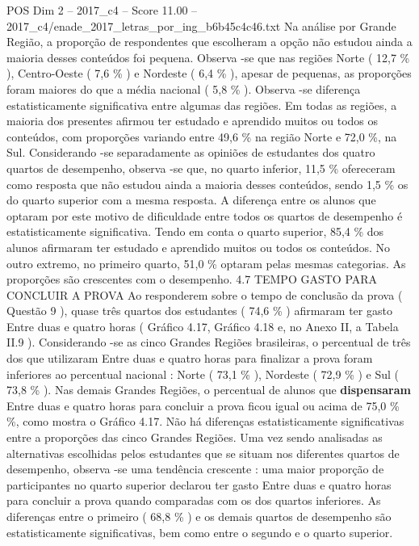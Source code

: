 \begin{textsample}{POS Dim 2 – 2017\_c4 – Score 11.00 – 2017\_c4/enade\_2017\_letras\_por\_ing\_b6b45c4c46.txt}
Na análise por Grande Região, a proporção de respondentes que escolheram a opção não estudou ainda a maioria desses conteúdos foi pequena.
Observa -se que nas regiões Norte ( 12,7 \% ), Centro-Oeste ( 7,6 \% ) e Nordeste ( 6,4 \% ), apesar de pequenas, as proporções foram maiores do que a média nacional ( 5,8 \% ).
Observa -se diferença estatisticamente significativa entre algumas das regiões.
Em todas as regiões, a maioria dos presentes afirmou ter estudado e aprendido muitos ou todos os conteúdos, com proporções variando entre 49,6 \% na região Norte e 72,0 \%, na Sul.
Considerando -se separadamente as opiniões de estudantes dos quatro quartos de desempenho, observa -se que, no quarto inferior, 11,5 \% ofereceram como resposta que não estudou ainda a maioria desses conteúdos, sendo 1,5 \% os do quarto superior com a mesma resposta.
A diferença entre os alunos que optaram por este motivo de dificuldade entre todos os quartos de desempenho é estatisticamente significativa.
Tendo em conta o quarto superior, 85,4 \% dos alunos afirmaram ter estudado e aprendido muitos ou todos os conteúdos.
No outro extremo, no primeiro quarto, 51,0 \% optaram pelas mesmas categorias.
As proporções são crescentes com o desempenho. 4.7 TEMPO GASTO PARA CONCLUIR A PROVA Ao responderem sobre o tempo de conclusão da prova ( Questão 9 ), quase três quartos dos estudantes ( 74,6 \% ) afirmaram ter gasto Entre duas e quatro horas ( Gráfico 4.17, Gráfico 4.18 e, no Anexo II, a Tabela II.9 ).
Considerando -se as cinco Grandes Regiões brasileiras, o percentual de três dos que utilizaram Entre duas e quatro horas para finalizar a prova foram inferiores ao percentual nacional : Norte ( 73,1 \% ), Nordeste ( 72,9 \% ) e Sul ( 73,8 \% ).
Nas demais Grandes Regiões, o percentual de alunos que \textbf{dispensaram} Entre duas e quatro horas para concluir a prova ficou igual ou acima de 75,0 \% \%, como mostra o Gráfico 4.17.
Não há diferenças estatisticamente significativas entre a proporções das cinco Grandes Regiões.
Uma vez sendo analisadas as alternativas escolhidas pelos estudantes que se situam nos diferentes quartos de desempenho, observa -se uma tendência crescente : uma maior proporção de participantes no quarto superior declarou ter gasto Entre duas e quatro horas para concluir a prova quando comparadas com os dos quartos inferiores.
As diferenças entre o primeiro ( 68,8 \% ) e os demais quartos de desempenho são estatisticamente significativas, bem como entre o segundo e o quarto superior.

\end{textsample}
